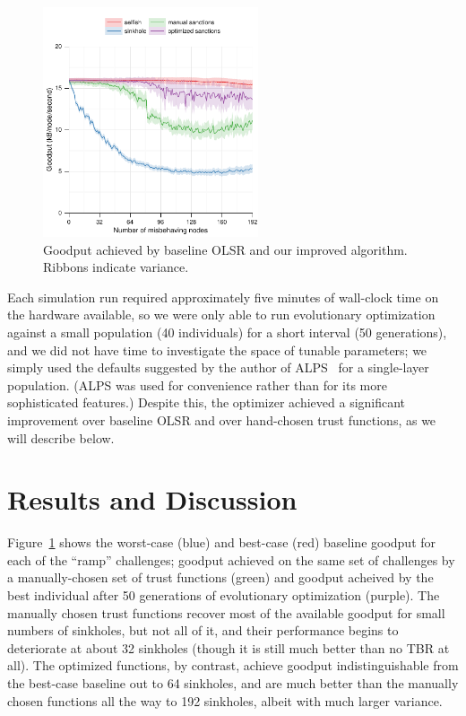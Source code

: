 \documentclass{article}
\begin{document}
\begin{figure}
\includegraphics[width=2.5in]{figures/monrampg}
\caption{Goodput achieved by baseline OLSR and our improved
  algorithm.  Ribbons indicate variance.}\label{f:results}
\end{figure}

Each simulation run required approximately five minutes of wall-clock
time on the hardware available, so we were only able to run
evolutionary optimization against a small population (40 individuals)
for a short interval (50 generations), and we did not have time to
investigate the space of tunable parameters; we simply used the
defaults suggested by the author of ALPS~\cite{z-alps1,z-alps2} for a
single-layer population.  (ALPS was used for convenience rather than
for its more sophisticated features.)  Despite this, the optimizer
achieved a significant improvement over baseline OLSR and over
hand-chosen trust functions, as we will describe below.

\section{Results and Discussion}

Figure~\ref{f:results} shows the worst-case (blue) and best-case (red)
baseline goodput for each of the “ramp” challenges; goodput achieved
on the same set of challenges by a manually-chosen set of trust
functions (green) and goodput acheived by the best individual after 50
generations of evolutionary optimization (purple).  The manually
chosen trust functions recover most of the available goodput for small
numbers of sinkholes, but not all of it, and their performance begins
to deteriorate at about 32 sinkholes (though it is still much better
than no TBR at all).  The optimized functions, by contrast, achieve
goodput indistinguishable from the best-case baseline out to 64
sinkholes, and are much better than the manually chosen functions all
the way to 192 sinkholes, albeit with much larger variance.
\end{document}
